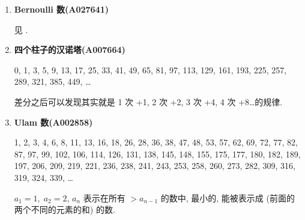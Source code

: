 \begin{enumerate}

\item \textbf{Bernoulli 数(A027641)}

见 .

\item \textbf{四个柱子的汉诺塔(A007664)}

0, 1, 3, 5, 9, 13, 17, 25, 33, 41, 49, 65, 81, 97, 113, 129, 161, 193, 225, 257, 289, 321, 385, 449, \dots

差分之后可以发现其实就是 1 次 +1, 2 次 +2, 3 次 +4, 4 次 +8\dots 的规律.

\item \textbf{Ulam 数(A002858)}

1, 2, 3, 4, 6, 8, 11, 13, 16, 18, 26, 28, 36, 38, 47, 48, 53, 57, 62, 69, 72, 77, 82, 87, 97, 99, 102, 106, 114, 126, 131, 138, 145, 148, 155, 175, 177, 180, 182, 189, 197, 206, 209, 219, 221, 236, 238, 241, 243, 253, 258, 260, 273, 282, 309, 316, 319, 324, 339, \dots

\( a_1 = 1,\; a_2 = 2 \), \(a_n\) 表示在所有 \(>a_{n-1}\) 的数中, 最小的, 能被表示成 (前面的两个不同的元素的和) 的数.

\end{enumerate}
